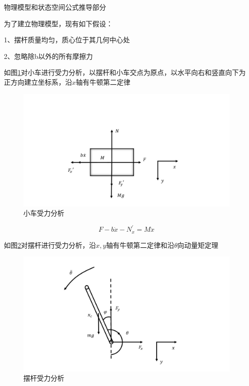 \documentclass{MathorCupmodeling}
\begin{document}
\begin{center}
{\Large 物理模型和状态空间公式推导部分}

\end{center}
    \newpage

为了建立物理模型，现有如下假设：

1、摆杆质量均匀，质心位于其几何中心处

2、忽略除b以外的所有摩擦力


如图\cref{小车受力分析}对小车进行受力分析，以摆杆和小车交点为原点，以水平向右和竖直向下为正方向建立坐标系，沿$x$轴有牛顿第二定律

\begin{figure}[hbpt]
\centering
\includegraphics[width=12cm]{小车受力分析.jpg}
\caption{小车受力分析}\label{小车受力分析}
\end{figure}


\begin{equation}
F-b\dot x-N_x^{'}=M\ddot x
\end{equation}

如图\cref{摆杆受力分析}对摆杆进行受力分析，沿$x,y$轴有牛顿第二定律和沿$\theta$向动量矩定理

\begin{figure}[hbpt]
\centering
\includegraphics[width=12cm]{摆杆受力分析.jpg}
\caption{摆杆受力分析}\label{摆杆受力分析}
\end{figure}
\end{document}
